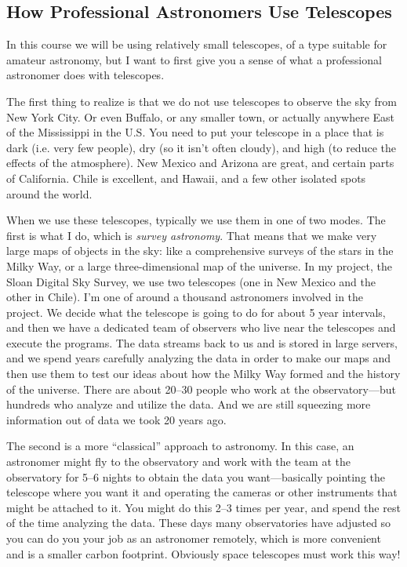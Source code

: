 \documentclass[12pt, preprint]{aastex}
\begin{document}
\subsection{How Professional Astronomers Use Telescopes}

In this course we will be using relatively small telescopes, of a type
suitable for amateur astronomy, but I want to first give you a sense
of what a professional astronomer does with telescopes. 

The first thing to realize is that we do not use telescopes to observe
the sky from New York City. Or even Buffalo, or any smaller town, or
actually anywhere East of the Mississippi in the U.S. You need to put
your telescope in a place that is dark (i.e. very few people), dry (so
it isn't often cloudy), and high (to reduce the effects of the
atmosphere). New Mexico and Arizona are great, and certain parts of
California. Chile is excellent, and Hawaii, and a few other isolated
spots around the world.

When we use these telescopes, typically we use them in one of two
modes. The first is what I do, which is {\it survey astronomy}. That
means that we make very large maps of objects in the sky: like a
comprehensive surveys of the stars in the Milky Way, or a large
three-dimensional map of the universe. In my project, the Sloan
Digital Sky Survey, we use two telescopes (one in New Mexico and the
other in Chile). I'm one of around a thousand astronomers involved in
the project. We decide what the telescope is going to do for about 5
year intervals, and then we have a dedicated team of observers who
live near the telescopes and execute the programs. The data streams
back to us and is stored in large servers, and we spend years
carefully analyzing the data in order to make our maps and then use
them to test our ideas about how the Milky Way formed and the history
of the universe. There are about 20--30 people who work at the
observatory---but hundreds who analyze and utilize the data.  And we
are still squeezing more information out of data we took 20 years ago.

The second is a more ``classical'' approach to astronomy. In this
case, an astronomer might fly to the observatory and work with the
team at the observatory for 5--6 nights to obtain the data you
want---basically pointing the telescope where you want it and
operating the cameras or other instruments that might be attached to
it. You might do this 2--3 times per year, and spend the rest of the
time analyzing the data. These days many observatories have adjusted
so you can do you your job as an astronomer remotely, which is more
convenient and is a smaller carbon footprint. Obviously space
telescopes must work this way!
\end{document}

